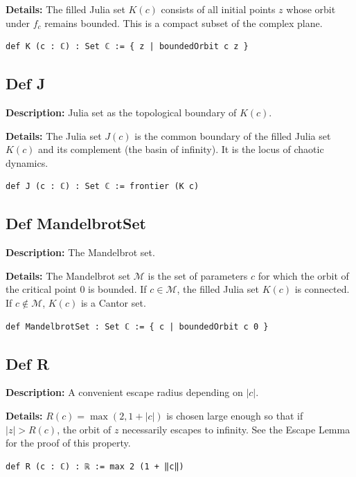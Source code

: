 \textbf{Details:} The filled Julia set $K(c)$ consists of all initial points $z$ whose orbit under $f_c$ remains bounded.
This is a compact subset of the complex plane.

\begin{lstlisting}[language=Lean]
def K (c : ℂ) : Set ℂ := { z | boundedOrbit c z }
\end{lstlisting}

\subsection*{Def J}
\textbf{Description:} Julia set as the topological boundary of $K(c)$.

\textbf{Details:} The Julia set $J(c)$ is the common boundary of the filled Julia set $K(c)$ and its complement (the basin of infinity).
It is the locus of chaotic dynamics.

\begin{lstlisting}[language=Lean]
def J (c : ℂ) : Set ℂ := frontier (K c)
\end{lstlisting}

\subsection*{Def MandelbrotSet}
\textbf{Description:} The Mandelbrot set.

\textbf{Details:} The Mandelbrot set $\mathcal{M}$ is the set of parameters $c$ for which the orbit of the critical point $0$ is bounded.
If $c \in \mathcal{M}$, the filled Julia set $K(c)$ is connected. If $c \notin \mathcal{M}$, $K(c)$ is a Cantor set.

\begin{lstlisting}[language=Lean]
def MandelbrotSet : Set ℂ := { c | boundedOrbit c 0 }
\end{lstlisting}

\subsection*{Def R}
\textbf{Description:} A convenient escape radius depending on $|c|$.

\textbf{Details:} $R(c) = \max(2, 1 + |c|)$ is chosen large enough so that if $|z| > R(c)$, the orbit of $z$ necessarily escapes to infinity.
See the Escape Lemma for the proof of this property.

\begin{lstlisting}[language=Lean]
def R (c : ℂ) : ℝ := max 2 (1 + ‖c‖)
\end{lstlisting}

